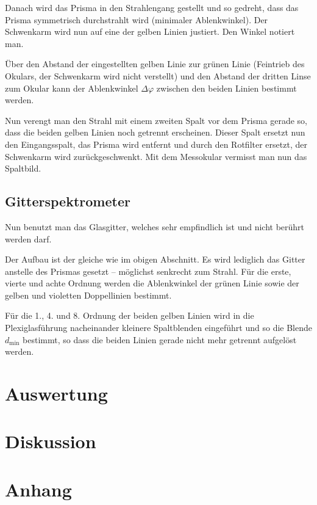 \documentclass[12pt,a4paper,titlepage,headinclude,bibtotoc]{scrartcl}
\begin{document}
Danach wird das Prisma in den Strahlengang gestellt und so gedreht, dass das Prisma symmetrisch durchstrahlt wird (minimaler Ablenkwinkel).
Der Schwenkarm wird nun auf eine der gelben Linien justiert.
Den Winkel notiert man.

Über den Abstand der eingestellten gelben Linie zur grünen Linie (Feintrieb des Okulars, der Schwenkarm wird nicht verstellt) und den Abstand der dritten Linse zum Okular kann der Ablenkwinkel $\Delta\varphi$ zwischen den beiden Linien bestimmt werden.

Nun verengt man den Strahl mit einem zweiten Spalt vor dem Prisma gerade so, dass die beiden gelben Linien noch getrennt erscheinen.
Dieser Spalt ersetzt nun den Eingangsspalt, das Prisma wird entfernt und durch den Rotfilter ersetzt, der Schwenkarm wird zurückgeschwenkt.
Mit dem Messokular vermisst man nun das Spaltbild.

\subsection{Gitterspektrometer}
Nun benutzt man das Glasgitter, welches sehr empfindlich ist und nicht berührt werden darf.

Der Aufbau ist der gleiche wie im obigen Abschnitt.
Es wird lediglich das Gitter anstelle des Prismas gesetzt -- möglichst senkrecht zum Strahl.
Für die erste, vierte und achte Ordnung werden die Ablenkwinkel der grünen Linie sowie der gelben und violetten Doppellinien bestimmt.

Für die 1., 4. und 8. Ordnung der beiden gelben Linien wird in die Plexiglasführung nacheinander kleinere Spaltblenden eingeführt und so die Blende $d_\text{min}$ bestimmt, so dass die beiden Linien gerade nicht mehr getrennt aufgelöst werden.

\section{Auswertung}
\label{sec:auswertung}


\section{Diskussion}
\label{sec:diskussion}

\section{Anhang}



\end{document}
